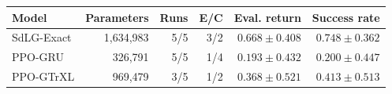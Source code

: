 \begin{tabular}{lrrrrr}
\toprule
Model & Parameters & Runs & E/C & Eval. return & Success rate \\
\midrule
SdLG-Exact & 1,634,983 & 5/5 & 3/2 & $0.668\pm0.408$ & $0.748\pm0.362$ \\
PPO-GRU & 326,791 & 5/5 & 1/4 & $0.193\pm0.432$ & $0.200\pm0.447$ \\
PPO-GTrXL & 969,479 & 3/5 & 1/2 & $0.368\pm0.521$ & $0.413\pm0.513$ \\
\bottomrule
\end{tabular}
